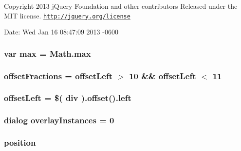 Copyright 2013 j\+Query Foundation and other contributors Released under the M\+I\+T license. \href{http://jquery.org/license}{\tt http\+://jquery.\+org/license}

Date\+: Wed Jan 16 08\+:47\+:09 2013 -\/0600 \hypertarget{jquery-ui_8js_a04fa2ea575d5471ca09e1b344ec4a69e}{
\subsubsection[{max}]{\setlength{\rightskip}{0pt plus 5cm}var max = Math.\+max}}\label{jquery-ui_8js_a04fa2ea575d5471ca09e1b344ec4a69e}
\hypertarget{jquery-ui_8js_aea9e2e5368b19ec9282f3c2c46649f2f}{
\subsubsection[{offset\+Fractions}]{ offset\+Fractions = {\bf offset\+Left} $>$ 10 \&\& {\bf offset\+Left} $<$ 11}}\label{jquery-ui_8js_aea9e2e5368b19ec9282f3c2c46649f2f}
\hypertarget{jquery-ui_8js_ab3511bef2cdef1db3f33b1cafbd75337}{
\subsubsection[{offset\+Left}]{\setlength{\rightskip}{0pt plus 5cm}offset\+Left = \$( div ).{\bf offset}().left}}\label{jquery-ui_8js_ab3511bef2cdef1db3f33b1cafbd75337}
\hypertarget{jquery-ui_8js_ae79c40a6bca8ca9dc7f8ac6778cad10a}{
\subsubsection[{overlay\+Instances}]{ dialog overlay\+Instances = 0}}\label{jquery-ui_8js_ae79c40a6bca8ca9dc7f8ac6778cad10a}
\hypertarget{jquery-ui_8js_a5cd004409a854f3c106e2c3424b89292}{
\subsubsection[{position}]{ position}}\label{jquery-ui_8js_a5cd004409a854f3c106e2c3424b89292}
